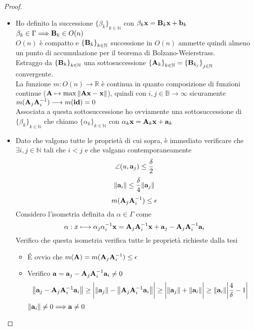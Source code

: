\documentclass[10pt,a4paper]{article}
\begin{document}
\begin{proof}
\begin{itemize}
\item Ho definito la successione ${ \{\beta_k \}}_{k \in \mathbb{N}}$  con  $\beta_k \vb{x = B}_k \vb{x + b}_k$   $\beta_k \in \Gamma \Longrightarrow \vb{B}_k \in O(n)$  \\
$O(n)$  è compatto e ${ \{\vb{B}_k \} }_{k \in \mathbb{N}}$ successione in  $O(n)$  ammette quindi almeno un punto di accumulazione per il teorema di Bolzano-Weierstrass. \\
Estraggo da ${ \{ \vb{B}_k \}}_{k \in \mathbb{N}}$  una sottosuccessione  $ { \{ \vb{A}_k \} }_{k \in \mathbb{N}} = { \{ \vb{B}_{k_j} \} }_{j \in \mathbb{N}}$  convergente.  \\
La funzione  $ m: O(n) \longrightarrow \mathbb{R}$  è continua in quanto composizione di funzioni continue ($ \vb{A} \mapsto \max{\norm{\vb{Ax-x}}} $), quindi con $i,j \in \mathbb{B} \longrightarrow \infty $ sicuramente $m(\vb{A}_j \vb{A}^{-1}_i) \longrightarrow m(\vb{id}) = 0 $ \\
Associata a questa sottosuccessione ho ovviamente una sottosuccessione di ${ \{\beta_k \}}_{k \in \mathbb{N}}$ che chiamo ${ \{\alpha_k \}}_{k \in \mathbb{N}}$ con  $\alpha_k \vb{x = A}_k \vb{x + a}_k$ 
\item Dato che valgono tutte le proprietà di cui sopra, è immediato verificare che $\exists i,j \in \mathbb{N} $  tali che  $ i < j$  e che valgano contemporaneamente
\[ \angle(u, \vb{a}_j ) \leq \frac{\delta}{2} \]
\[ \norm{\vb{a}_i} \leq \frac{\delta}{4}\norm{\vb{a}_j} \]
\[ m( \vb{A}_j \vb{A}^{-1}_i ) \leq \epsilon \]
Considero l'isometria definita da $\alpha \in \Gamma$ come 
\[ \alpha : x \longmapsto \alpha_j \alpha^{-1}_i \vb{x} = \vb{A}_j \vb{A}^{-1}_i \vb{x} + \vb{a}_j - \vb{A}_j \vb{A}^{-1}_i \vb{a}_i\]
Verifico che questa isometria verifica tutte le proprietà richieste dalla tesi

\begin{itemize}
\item \'E ovvio che $m(\vb{A}) = m(\vb{A}_j \vb{A}^{-1}_i) \leq \epsilon$ 
\item Verifico  $\vb{a}= \vb{a}_j - \vb{A}_j \vb{A}^{-1}_i \vb{a}_i \neq 0$ 
\[ \norm{\vb{a}_j - \vb{A}_j \vb{A}^{-1}_i \vb{a}_i} \geq \bigg| \norm{\vb{a}_j} - \norm{ \vb{A}_j \vb{A}^{-1}_i \vb{a}_i } \bigg| \geq \bigg| \norm{\vb{a}_j } + \norm{\vb{a}_i} \bigg| \geq \norm{\vb{a}_i} \bigg| \frac{4}{\delta} -1 \bigg| \]
$\norm{\vb{a}_i} \neq 0 \Longrightarrow \vb{a} \neq 0$
 

\end{itemize}
\end{itemize}
\end{proof}
\end{document}
